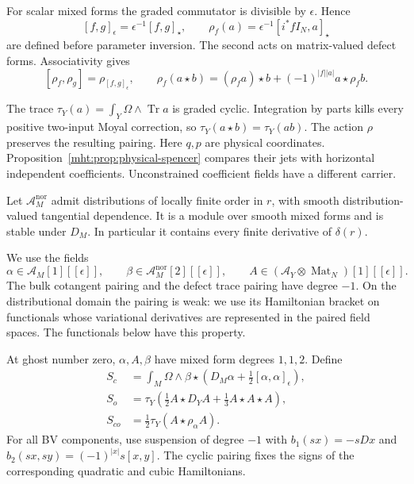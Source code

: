 For scalar mixed forms the graded commutator is
divisible by $\epsilon$. Hence
\[
 [f,g]_\epsilon=\epsilon^{-1}[f,g]_\star,
 \qquad
 \rho_f(a)=\epsilon^{-1}[i^*fI_N,a]_\star
\]
are defined before parameter inversion. The second acts on
matrix-valued defect forms. Associativity gives
\[
 [\rho_f,\rho_g]=\rho_{[f,g]_\epsilon},\qquad
 \rho_f(a\star b)=(\rho_fa)\star b
                    +(-1)^{|f||a|}a\star\rho_fb.
\]

The trace $\tau_Y(a)=\int_Y\Omega\wedge\operatorname{Tr}a$
is graded cyclic. Integration by parts kills every positive
two-input Moyal correction, so $\tau_Y(a\star b)=\tau_Y(ab)$.
The action $\rho$ preserves the resulting pairing. Here $q,p$
are physical coordinates. Proposition~\ref{mht:prop:physical-spencer}
compares their jets with horizontal independent coefficients.
Unconstrained coefficient fields have a different carrier.

Let $\mathcal A_M^{\mathrm{nor}}$ admit distributions of locally
finite order in $r$, with smooth distribution-valued tangential
dependence. It is a module over smooth mixed forms and is
stable under $D_M$. In particular it contains every finite
derivative of $\delta(r)$.

We use the fields
\[
 \alpha\in\mathcal A_M[1][[\epsilon]],\qquad
 \beta\in\mathcal A_M^{\mathrm{nor}}[2][[\epsilon]],\qquad
 A\in(\mathcal A_Y\otimes\operatorname{Mat}_N)[1][[\epsilon]].
\]
The bulk cotangent pairing and the defect trace pairing have
degree $-1$. On the distributional domain the pairing is
weak: we use its Hamiltonian bracket on functionals whose
variational derivatives are represented in the paired field
spaces. The functionals below have this property.

At ghost number zero, $\alpha,A,\beta$ have
mixed form degrees $1,1,2$. Define
\begin{align}
 S_c&=\int_M\Omega\wedge\beta\star
             \left(D_M\alpha+\tfrac12[\alpha,\alpha]_\epsilon\right),
       \label{mht:eq:geometric-bulk-action}\\
 S_o&=\tau_Y\left(\tfrac12 A\star D_YA
                             +\tfrac13 A\star A\star A\right),
       \label{mht:eq:geometric-open-action}\\
 S_{co}&=\tfrac12\tau_Y(A\star\rho_\alpha A).
       \label{mht:eq:geometric-coupling}
\end{align}
For all BV components, use suspension of degree $-1$ with
$b_1(sx)=-sDx$ and $b_2(sx,sy)=(-1)^{|x|}s[x,y]$.
The cyclic pairing fixes the signs of the corresponding
quadratic and cubic Hamiltonians.

